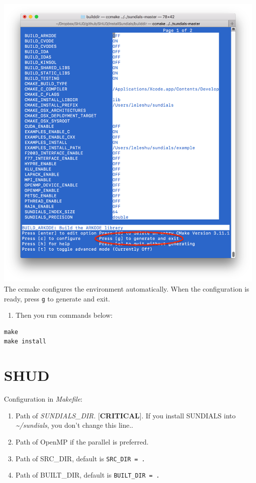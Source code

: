 \documentclass[
]{scrbook}
\providecommand{\tightlist}{%
  \setlength{\itemsep}{0pt}\setlength{\parskip}{0pt}}
\begin{document}
\includegraphics{Fig/ccmake/3.png}
The ccmake configures the environment automatically. When the configuration is ready, press \texttt{g} to generate and exit.

\begin{enumerate}
\def\labelenumi{\arabic{enumi}.}
\tightlist
\item
  Then you run commands below:
\end{enumerate}

\begin{verbatim}
make
make install 
\end{verbatim}

\hypertarget{shud}{%
\section{SHUD}\label{shud}}

Configuration in \emph{Makefile}:

\begin{enumerate}
\def\labelenumi{\arabic{enumi}.}
\tightlist
\item
  Path of \emph{SUNDIALS\_DIR.} {[}\textbf{CRITICAL}{]}. If you install SUNDIALS into \emph{\textasciitilde/sundials}, you don't change this line..
\item
  Path of OpenMP if the parallel is preferred.
\item
  Path of SRC\_DIR, default is \texttt{SRC\_DIR\ =\ .}
\item
  Path of BUILT\_DIR, default is \texttt{BUILT\_DIR\ =\ .}
\end{enumerate}
\end{document}
